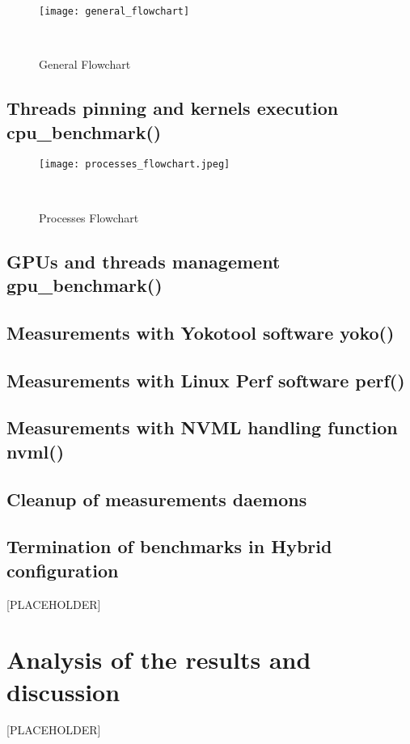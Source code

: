 \begin{figure}[hbtp]
    \centering
    \texttt{[image: general\_flowchart]}
    \caption{General Flowchart}~\label{fig:general_flowchart}
\end{figure}


\subsection{Threads pinning and kernels execution \- cpu\_benchmark()}

\begin{figure}[hbtp]
    \centering
    \texttt{[image: processes\_flowchart.jpeg]}
    \caption{Processes Flowchart}~\label{fig:processes_flowchart.jpeg}
\end{figure}


\subsection{GPUs and threads management \- gpu\_benchmark()}

\subsection{Measurements with Yokotool software \- yoko()}

\subsection{Measurements with Linux Perf software \- perf()}

\subsection{Measurements with NVML handling function \- nvml()}

\subsection{Cleanup of measurements daemons}

\subsection{Termination of benchmarks in Hybrid configuration}


[PLACEHOLDER]

\section{Analysis of the results and discussion}

[PLACEHOLDER]

